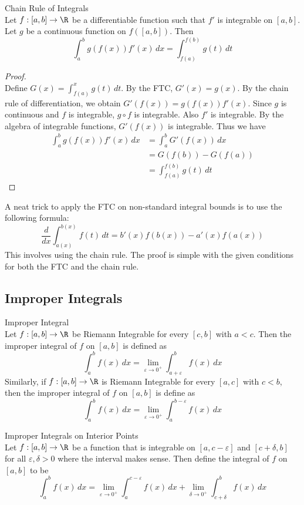 \documentclass[a4paper]{article}
\begin{document}
\begin{thm}{Chain Rule of Integrals}{}\\ Let $f:[a,b]\to\R$ be a differentiable function such that $f'$ is integrable on $[a,b]$. Let $g$ be a continuous function on $f([a,b])$. Then $$\int_{a}^{b}g\left(f(x)\right)f'(x)\,dx=\int_{f(a)}^{f(b)}g(t)\,dt$$ 
\begin{proof}\\
Define $G(x)=\int_{f(a)}^xg(t)\,dt$. By the FTC, $G'(x)=g(x)$. By the chain rule of differentiation, we obtain $G'(f(x))=g(f(x))f'(x)$. Since $g$ is continuous and $f$ is integrable, $g\circ f$ is integrable. Also $f'$ is integrable. By the algebra of integrable functions, $G'(f(x))$ is integrable. Thus we have
\begin{align*}
\int_a^bg(f(x))f'(x)\,dx&=\int_a^bG'(f(x))\,dx\\
&=G(f(b))-G(f(a))\tag{FTC}\\
&=\int_{f(a)}^{f(b)}g(t)\,dt\tag{FTC}
\end{align*}
\end{proof}
\end{thm}

A neat trick to apply the FTC on non-standard integral bounds is to use the following formula: $$\frac{d}{dx}\int_{a(x)}^{b(x)}f(t)\,dt=b'(x)f(b(x))-a'(x)f(a(x))$$ This involves using the chain rule. The proof is simple with the given conditions for both the FTC and the chain rule. 

\subsection{Improper Integrals}
\begin{defn}{Improper Integral}{}\\ Let $f:[a,b]\to\R$ be Riemann Integrable for every $[c,b]$ with $a<c$. Then the improper integral of $f$ on $[a,b]$ is defined as $$\int_a^bf(x)\,dx=\lim_{\varepsilon\to0^+}\int_{a+\varepsilon}^bf(x)\,dx $$
Similarly, if $f:[a,b]\to\R$ is Riemann Integrable for every $[a,c]$ with $c<b$, then the improper integral of $f$ on $[a,b]$ is define as $$\int_a^bf(x)\,dx=\lim_{\varepsilon\to0^+}\int_a^{b-\varepsilon}f(x)\,dx$$
\end{defn}

\begin{defn}{Improper Integrals on Interior Points}{}\\ Let $f:[a,b]\to\R$ be a function that is integrable on $[a,c-\varepsilon]$ and $[c+\delta,b]$ for all $\varepsilon,\delta>0$ where the interval makes sense. Then define the integral of $f$ on $[a,b]$ to be $$\int_a^bf(x)\,dx=\lim_{\varepsilon\to0^+}\int_a^{c-\varepsilon}f(x)\,dx+\lim_{\delta\to0^+}\int_{c+\delta}^bf(x)\,dx$$
\end{defn}
\end{document}

